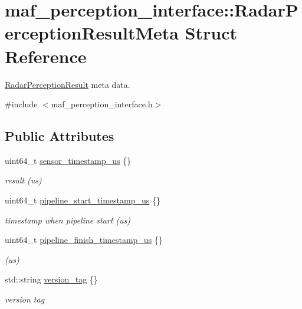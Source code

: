 \hypertarget{structmaf__perception__interface_1_1RadarPerceptionResultMeta}{}\section{maf\+\_\+perception\+\_\+interface\+:\+:Radar\+Perception\+Result\+Meta Struct Reference}
\label{structmaf__perception__interface_1_1RadarPerceptionResultMeta}


\hyperlink{structmaf__perception__interface_1_1RadarPerceptionResult}{Radar\+Perception\+Result} meta data.  




{\ttfamily \#include $<$maf\+\_\+perception\+\_\+interface.\+h$>$}

\subsection*{Public Attributes}
\begin{DoxyCompactItemize}
\item 
uint64\+\_\+t \hyperlink{structmaf__perception__interface_1_1RadarPerceptionResultMeta_a351822a78d94b6bc8c38f74373250af3}{sensor\+\_\+timestamp\+\_\+us} \{\}
\begin{DoxyCompactList}\small\item\em result (us) \end{DoxyCompactList}\item 
uint64\+\_\+t \hyperlink{structmaf__perception__interface_1_1RadarPerceptionResultMeta_a49d462a4438b503cb76cc6767c15fcf4}{pipeline\+\_\+start\+\_\+timestamp\+\_\+us} \{\}
\begin{DoxyCompactList}\small\item\em timestamp when pipeline start (us) \end{DoxyCompactList}\item 
uint64\+\_\+t \hyperlink{structmaf__perception__interface_1_1RadarPerceptionResultMeta_a8c6bfe6914a51bb54b9879d05f52a676}{pipeline\+\_\+finish\+\_\+timestamp\+\_\+us} \{\}
\begin{DoxyCompactList}\small\item\em (us) \end{DoxyCompactList}\item 
std\+::string \hyperlink{structmaf__perception__interface_1_1RadarPerceptionResultMeta_a5ffd590fe09832b825297c86c4dc6d83}{version\+\_\+tag} \{\}
\begin{DoxyCompactList}\small\item\em version tag \end{DoxyCompactList}\end{DoxyCompactItemize}



